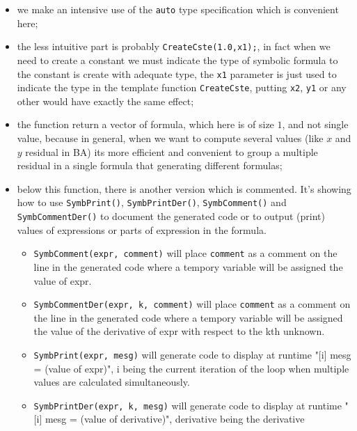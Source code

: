 \begin{itemize}
   \item we make an intensive use of the {\tt auto} type specification which
         is convenient here;

   \item the less intuitive part is probably {\tt  CreateCste(1.0,x1);},  in fact
         when we need to create a constant  we must indicate the type of symbolic
         formula to the constant is create with adequate type, the {\tt x1} parameter
         is just used to indicate the type in the template function {\tt CreateCste},
         putting {\tt x2}, {\tt y1} or any other would have exactly the same effect;

   \item the function return a vector of formula, which here is of size $1$, and not
         single value, because in general, when we want to compute several values (like
         $x$ and $y$ residual in BA)  its more efficient and convenient to group 
         a multiple residual in a single formula that generating different formulas;
   \item below this function, there is another version which is commented. It's showing
         how to use {\tt SymbPrint()}, {\tt SymbPrintDer()}, {\tt SymbComment()} and 
         {\tt SymbCommentDer()} to document the generated code or to output (print) 
         values of expressions or parts of expression in the formula.
   \begin{itemize}
         \item {\tt SymbComment(expr, comment)} will place {\tt comment} as a comment
               on the line in the generated code where a tempory variable will be assigned
               the value of expr.
         \item {\tt SymbCommentDer(expr, k, comment)} will place {\tt comment} as a comment
               on the line in the generated code where a tempory variable will be assigned 
               the value of the derivative of expr with respect to the kth unknown.
         \item {\tt SymbPrint(expr, mesg)} will generate code to display at runtime
               "[i] mesg =  (value of expr)", i being the current iteration of the loop
               when multiple values are calculated simultaneously.
         \item {\tt SymbPrintDer(expr, k, mesg)} will generate code to display at runtime
               "[i] mesg = (value of derivative)", derivative being the derivative

\end{itemize}
\end{itemize}
